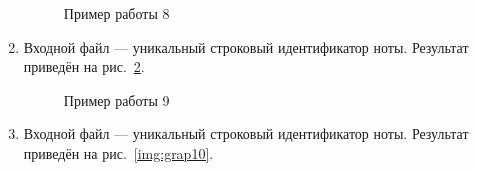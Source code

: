 \documentclass[12pt, a4paper]{article}
\begin{document}
\begin{enumerate}
\begin{figure}[h]
  		\caption{Пример работы 8}
  		\label{img:grap8}
	\end{figure}
	\newpage
	\item Входной файл --- уникальный строковый идентификатор ноты.
	Результат приведён на рис.~\ref{img:grap9}.
	\begin{figure}[h]
  		\caption{Пример работы 9}
  		\label{img:grap9}
	\end{figure}
	\newpage
	\item Входной файл --- уникальный строковый идентификатор ноты.
	Результат приведён на рис.~\ref{img:grap10}.
	\begin{figure}[h]

\end{figure}
\end{enumerate}
\end{document}

